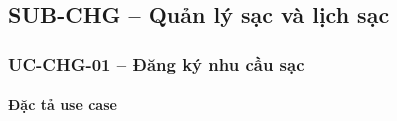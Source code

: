 \subsection{SUB-CHG -- Quản lý sạc và lịch sạc}


\subsubsection{UC-CHG-01 -- Đăng ký nhu cầu sạc}


\paragraph{Đặc tả use case}
\small
